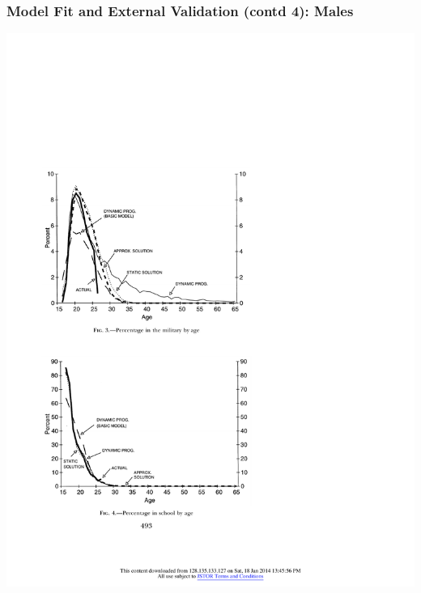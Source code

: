 \begin{frame}
	\frametitle{Model Fit and External Validation (contd 4): Males}
	\begin{center}
	\includegraphics[width=.9\textwidth]{tab-figs/figure4_1997}
	\end{center}
\end{frame}

